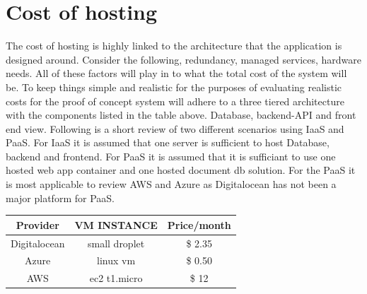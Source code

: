 \documentclass[]{uiophd}
\begin{document}
\section{Cost of hosting}
The cost of hosting is highly linked to the architecture that the application is designed around. Consider the following, redundancy, managed services, hardware needs. All of these factors will play in to what the total cost of the system will be. To keep things simple and realistic for the purposes of evaluating realistic costs for the proof of concept system will adhere to a three tiered architecture with the components listed in the table above. Database, backend-API and front end view. Following is a short review of two different scenarios using IaaS and PaaS. For IaaS it is assumed that one server is sufficient to host Database, backend and frontend. For PaaS it is assumed that it is sufficiant to use one hosted web app container and one hosted document db solution. For the PaaS it is most applicable to review AWS and Azure as Digitalocean has not been a major platform for PaaS.

\begin{center}
 \begin{tabular}{||c | c | c ||} 
 \hline
 Provider & VM INSTANCE & Price/month \\ [0.5ex] 
 \hline\hline
 Digitalocean & small droplet & \$ 2.35 \\ 
 \hline
 Azure & linux vm &\$ 0.50 \\
 \hline
 AWS & ec2 t1.micro &\$ 12 \\
 \hline
\end{tabular}
\end{center}
\end{document}
